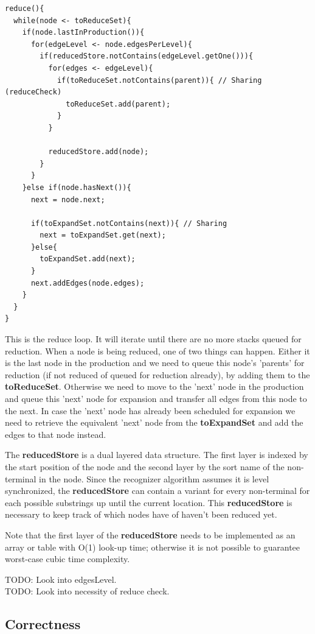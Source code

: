 \documentclass[a4paper,10pt]{article}
\begin{document}
{\small
\begin{verbatim}
reduce(){
  while(node <- toReduceSet){
    if(node.lastInProduction()){
      for(edgeLevel <- node.edgesPerLevel){
        if(reducedStore.notContains(edgeLevel.getOne())){
          for(edges <- edgeLevel){
            if(toReduceSet.notContains(parent)){ // Sharing (reduceCheck)
              toReduceSet.add(parent);
            }
          }
          
          reducedStore.add(node);
        }
      }
    }else if(node.hasNext()){
      next = node.next;
      
      if(toExpandSet.notContains(next)){ // Sharing
        next = toExpandSet.get(next);
      }else{
        toExpandSet.add(next);
      }
      next.addEdges(node.edges);
    }
  }
}
\end{verbatim}
}

This is the reduce loop. It will iterate until there are no more stacks queued for reduction. When a node is being reduced, one of two things can happen. Either it is the last node in the production and we need to queue this node's 'parents' for reduction (if not reduced of queued for reduction already), by adding them to the {\bf toReduceSet}. Otherwise we need to move to the 'next' node in the production and queue this 'next' node for expansion and transfer all edges from this node to the next. In case the 'next' node has already been scheduled for expansion we need to retrieve the equivalent 'next' node from the {\bf toExpandSet} and add the edges to that node instead.

The {\bf reducedStore} is a dual layered data structure. The first layer is indexed by the start position of the node and the second layer by the sort name of the non-terminal in the node. Since the recognizer algorithm assumes it is level synchronized, the {\bf reducedStore} can contain a variant for every non-terminal for each possible substrings up until the current location. This {\bf reducedStore} is necessary to keep track of which nodes have of haven't been reduced yet.

Note that the first layer of the {\bf reducedStore} needs to be implemented as an array or table with O(1) look-up time; otherwise it is not possible to guarantee worst-case cubic time complexity.

TODO: Look into edgesLevel.\\
TODO: Look into necessity of reduce check.

\subsection{Correctness}
\end{document}
